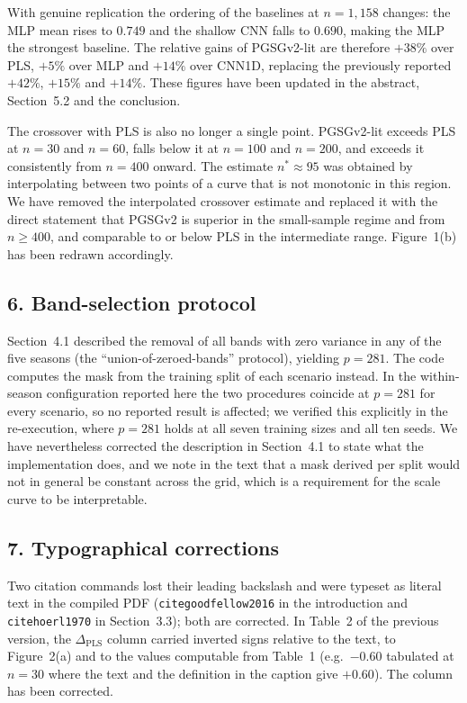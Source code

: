 With genuine replication the ordering of the baselines at $n = 1{,}158$
changes: the MLP mean rises to $0.749$ and the shallow CNN falls to $0.690$,
making the MLP the strongest baseline. The relative gains of PGSGv2-lit are
therefore $+38\%$ over PLS, $+5\%$ over MLP and $+14\%$ over CNN1D, replacing
the previously reported $+42\%$, $+15\%$ and $+14\%$. These figures have been
updated in the abstract, Section~5.2 and the conclusion.

The crossover with PLS is also no longer a single point. PGSGv2-lit exceeds
PLS at $n = 30$ and $n = 60$, falls below it at $n = 100$ and $n = 200$, and
exceeds it consistently from $n = 400$ onward. The estimate $n^{*} \approx 95$
was obtained by interpolating between two points of a curve that is not
monotonic in this region. We have removed the interpolated crossover estimate
and replaced it with the direct statement that PGSGv2 is superior in the
small-sample regime and from $n \geq 400$, and comparable to or below PLS in
the intermediate range. Figure~1(b) has been redrawn accordingly.

\subsection*{6. Band-selection protocol}

Section~4.1 described the removal of all bands with zero variance in any of
the five seasons (the ``union-of-zeroed-bands'' protocol), yielding
$p = 281$. The code computes the mask from the training split of each
scenario instead. In the within-season configuration reported here the two
procedures coincide at $p = 281$ for every scenario, so no reported result is
affected; we verified this explicitly in the re-execution, where $p = 281$
holds at all seven training sizes and all ten seeds. We have nevertheless
corrected the description in Section~4.1 to state what the implementation
does, and we note in the text that a mask derived per split would not in
general be constant across the grid, which is a requirement for the scale
curve to be interpretable.

\subsection*{7. Typographical corrections}

Two citation commands lost their leading backslash and were typeset as
literal text in the compiled PDF (\texttt{citegoodfellow2016} in the
introduction and \texttt{citehoerl1970} in Section~3.3); both are corrected.
In Table~2 of the previous version, the $\Delta_{\text{PLS}}$ column carried
inverted signs relative to the text, to Figure~2(a) and to the values
computable from Table~1 (e.g.\ $-0.60$ tabulated at $n = 30$ where the text
and the definition in the caption give $+0.60$). The column has been
corrected.


